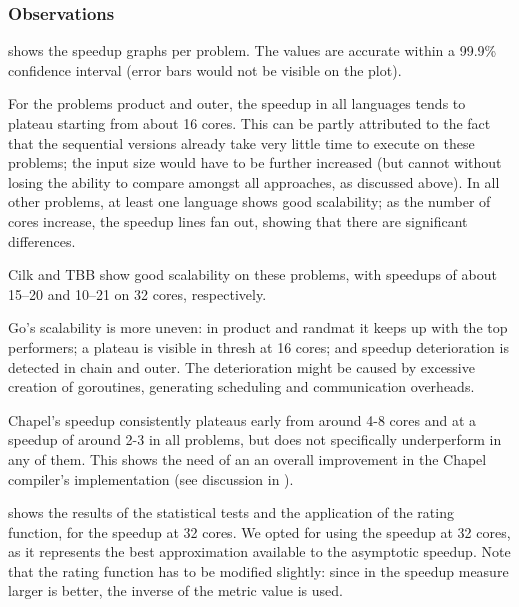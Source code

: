 \subsubsection{Observations}  shows the speedup graphs per problem. The values are accurate within a 99.9\% confidence interval (error bars would not be visible on the plot).

For the problems product and outer, the speedup in all languages tends to plateau starting from about 16 cores. This can be partly attributed to the fact that the sequential versions already take very little time to execute on these problems; the input size would have to be further increased (but cannot without losing the ability to compare amongst all approaches, as discussed above). In all other problems, at least one language shows good scalability; as the number of cores increase, the speedup lines fan out, showing that there are significant differences.

Cilk and TBB show good scalability on these problems, with speedups of about 15--20 and 10--21 on 32 cores, respectively. 

Go's scalability is more uneven: in product and randmat it keeps up with the top performers; a plateau is visible in thresh at 16 cores; and speedup deterioration is detected in chain and outer. The deterioration might be caused by excessive creation of goroutines, generating scheduling and communication overheads. 

Chapel's speedup consistently plateaus early from around 4-8 cores and at a speedup of around 2-3 in all problems, but does not specifically underperform in any of them. This shows the need of an an overall improvement in the Chapel compiler's implementation (see discussion in ).

 shows the results of the statistical tests and the application of the rating function, for the speedup at 32 cores. We opted for using the speedup at 32 cores, as it represents the best approximation available to the asymptotic speedup. Note that the rating function has to be modified slightly: since in the speedup measure larger is better, the inverse of the metric value is used.

